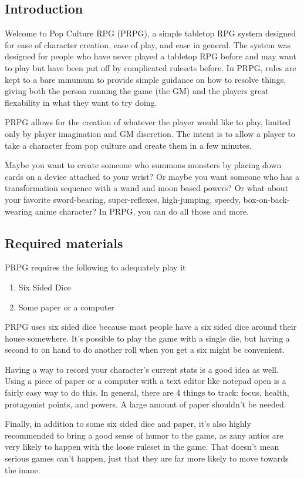 \begin{flushleft}

\chapter{Introduction}

Welcome to Pop Culture RPG (PRPG), a simple tabletop RPG system designed
for ease of character creation, ease of play, and ease in general. The system
was designed for people who have never played a tabletop RPG before and may
want to play but have been put off by complicated rulesets before. In PRPG,
rules are kept to a bare minumum to provide simple guidance on how to resolve
things, giving both the person running the game (the GM) and the players great
flexability in what they want to try doing.

PRPG allows for the creation of whatever the player would like to play, limited
only by player imagination and GM discretion. The intent is to allow a player
to take a character from pop culture and create them in a few minutes.

Maybe you want to create someone who summons monsters by placing down cards on a
device attached to your wrist? Or maybe you want someone who has a
transformation sequence with a wand and moon based powers? Or what about your
favorite sword-bearing, super-reflexes, high-jumping, speedy,
box-on-back-wearing anime character? In PRPG, you can do all those and more.

\section*{Required materials}

PRPG requires the following to adequately play it

\begin{enumerate}
    \item Six Sided Dice
    \item Some paper or a computer
\end{enumerate}

PRPG uses six sided dice because most people have a six sided dice around
their house somewhere. It's possible to play the game with a single die,
but having a second to on hand to do another roll when you get a six might
be convenient.

Having a way to record your character's current stats is a good idea as well.
Using a piece of paper or a computer with a text editor like notepad open is
a fairly easy way to do this. In general, there are 4 things to track: focus,
health, protagonist points, and powers. A large amount of paper shouldn't be
needed.

Finally, in addition to some six sided dice and paper, it's also highly
recommended to bring a good sense of humor to the game, as zany antics are very
likely to happen with the loose ruleset in the game. That doesn't mean serious
games can't happen, just that they are far more likely to move towards the
inane.

\end{flushleft}
